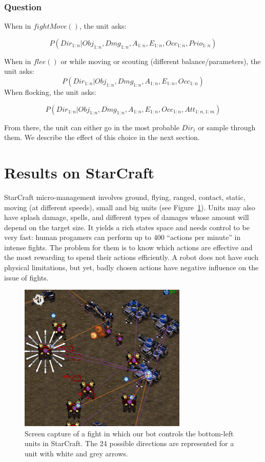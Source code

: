 \subsubsection{Question}

When in $fightMove()$, the unit asks:
\begin{small}
$$P(Dir_{1:n} \mathbf{|} Obj_{1:n}, Dmg_{1:n}, A_{1:n}, E_{1:n}, Occ_{1:n}, Prio_{1:n})$$
\end{small}
When in $flee()$ or while moving or scouting (different balance/parameters), the unit asks:
$$P(Dir_{1:n} \mathbf{|} Obj_{1:n}, Dmg_{1:n}, A_{1:n}, E_{1:n}, Occ_{1:n})$$
When flocking, the unit asks:
\begin{small}
$$P(Dir_{1:n} \mathbf{|} Obj_{1:n}, Dmg_{1:n}, A_{1:n}, E_{1:n}, Occ_{1:n}, Att_{1:n,1:m}) $$
\end{small}
From there, the unit can either go in the most probable $Dir_i$ or sample through them. We describe the effect of this choice in the next section.

\section{Results on StarCraft}
StarCraft micro-management involves ground, flying, ranged, contact, static, moving (at different speeds), small and big units (see Figure~\ref{fig:sc_fight}). Units may also have splash damage, spells, and different types of damages whose amount will depend on the target size. It yields a rich states space and needs control to be very fast: human progamers can perform up to 400 ``actions per minute'' in intense fights. The problem for them is to know which actions are effective and the most rewarding to spend their actions efficiently. A robot does not have such physical limitations, but yet, badly chosen actions have negative influence on the issue of fights. %
\begin{figure}
\begin{center}
\includegraphics[width=8cm]{images/SC_fight_3b.png}
\end{center}
\label{fig:sc_fight}
\caption{Screen capture of a fight in which our bot controls the bottom-left units in StarCraft. The 24 possible directions are represented for a unit with white and grey arrows.}
\end{figure}

